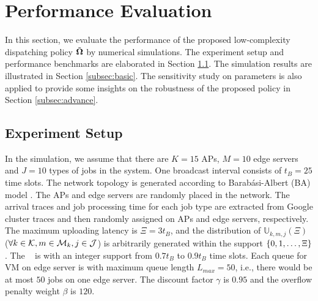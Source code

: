 \section{Performance Evaluation}
\label{sec:evaluation}
In this section, we evaluate the performance of the proposed low-complexity dispatching policy $\tilde{\boldsymbol{\Omega}}$ by numerical simulations.
The experiment setup and performance benchmarks are elaborated in Section \ref{subsec:setup}.
The simulation results are illustrated in Section \ref{subsec:basic}.
The sensitivity study on parameters is also applied to provide some insights on the robustness of the proposed policy in Section \ref{subsec:advance}.

\subsection{Experiment Setup}
\label{subsec:setup}
In the simulation, we assume that there are $K=15$ APs, $M=10$ edge servers and $J=10$ types of jobs in the system.
One broadcast interval consists of $t_{B}=25$ time slots.
The network topology is generated according to Barab\'asi-Albert (BA) model \cite{albert1999diameter}.
The APs and edge servers are randomly placed in the network.
The arrival traces and job processing time for each job type are extracted from Google cluster traces \cite{clusterdata:Reiss2011} and then randomly assigned on APs and edge servers, respectively.
The maximum uploading latency is $\Xi = 3t_B$, and the distribution of $\mathbb{U}_{k,m,j}(\Xi)$ ($\forall k\in\mathcal{K}, m\in\mathcal{M}_{k}, j\in\mathcal{J}$) is arbitrarily generated within the support $\{0, 1, \dots, \Xi\}$.
The \brlatency~ is with an integer support from $0.7t_B$ to $0.9t_B$ time slots.
Each queue for VM on edge server is with maximum queue length $L_{max}=50$, i.e., there would be at most $50$ jobs on one edge server.
The discount factor $\gamma$ is $0.95$ and the overflow penalty weight $\beta$ is $120$.

